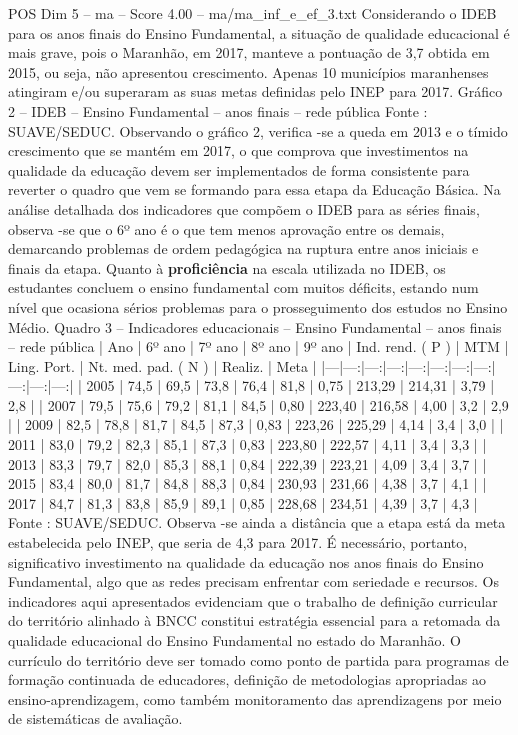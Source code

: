 \begin{textsample}{POS Dim 5 – ma – Score 4.00 – ma/ma\_inf\_e\_ef\_3.txt}
Considerando o IDEB para os anos finais do Ensino Fundamental, a situação de qualidade educacional é mais grave, pois o Maranhão, em 2017, manteve a pontuação de 3,7 obtida em 2015, ou seja, não apresentou crescimento.
Apenas 10 municípios maranhenses atingiram e/ou superaram as suas metas definidas pelo INEP para 2017.
Gráfico 2 – IDEB – Ensino Fundamental – anos finais – rede pública Fonte : SUAVE/SEDUC.
Observando o gráfico 2, verifica -se a queda em 2013 e o tímido crescimento que se mantém em 2017, o que comprova que investimentos na qualidade da educação devem ser implementados de forma consistente para reverter o quadro que vem se formando para essa etapa da Educação Básica.
Na análise detalhada dos indicadores que compõem o IDEB para as séries finais, observa -se que o 6º ano é o que tem menos aprovação entre os demais, demarcando problemas de ordem pedagógica na ruptura entre anos iniciais e finais da etapa.
Quanto à \textbf{proficiência} na escala utilizada no IDEB, os estudantes concluem o ensino fundamental com muitos déficits, estando num nível que ocasiona sérios problemas para o prosseguimento dos estudos no Ensino Médio.
Quadro 3 – Indicadores educacionais – Ensino Fundamental – anos finais – rede pública | Ano | 6º ano | 7º ano | 8º ano | 9º ano | Ind. rend. ( P ) | MTM | Ling.
Port. | Nt. med. pad. ( N ) | Realiz. | Meta | |---|---:|---:|---:|---:|---:|---:|---:|---:|---:|---:| | 2005 | 74,5 | 69,5 | 73,8 | 76,4 | 81,8 | 0,75 | 213,29 | 214,31 | 3,79 | 2,8 | | 2007 | 79,5 | 75,6 | 79,2 | 81,1 | 84,5 | 0,80 | 223,40 | 216,58 | 4,00 | 3,2 | 2,9 | | 2009 | 82,5 | 78,8 | 81,7 | 84,5 | 87,3 | 0,83 | 223,26 | 225,29 | 4,14 | 3,4 | 3,0 | | 2011 | 83,0 | 79,2 | 82,3 | 85,1 | 87,3 | 0,83 | 223,80 | 222,57 | 4,11 | 3,4 | 3,3 | | 2013 | 83,3 | 79,7 | 82,0 | 85,3 | 88,1 | 0,84 | 222,39 | 223,21 | 4,09 | 3,4 | 3,7 | | 2015 | 83,4 | 80,0 | 81,7 | 84,8 | 88,3 | 0,84 | 230,93 | 231,66 | 4,38 | 3,7 | 4,1 | | 2017 | 84,7 | 81,3 | 83,8 | 85,9 | 89,1 | 0,85 | 228,68 | 234,51 | 4,39 | 3,7 | 4,3 | Fonte : SUAVE/SEDUC.
Observa -se ainda a distância que a etapa está da meta estabelecida pelo INEP, que seria de 4,3 para 2017.
É necessário, portanto, significativo investimento na qualidade da educação nos anos finais do Ensino Fundamental, algo que as redes precisam enfrentar com seriedade e recursos.
Os indicadores aqui apresentados evidenciam que o trabalho de definição curricular do território alinhado à BNCC constitui estratégia essencial para a retomada da qualidade educacional do Ensino Fundamental no estado do Maranhão.
O currículo do território deve ser tomado como ponto de partida para programas de formação continuada de educadores, definição de metodologias apropriadas ao ensino-aprendizagem, como também monitoramento das aprendizagens por meio de sistemáticas de avaliação.

\end{textsample}
